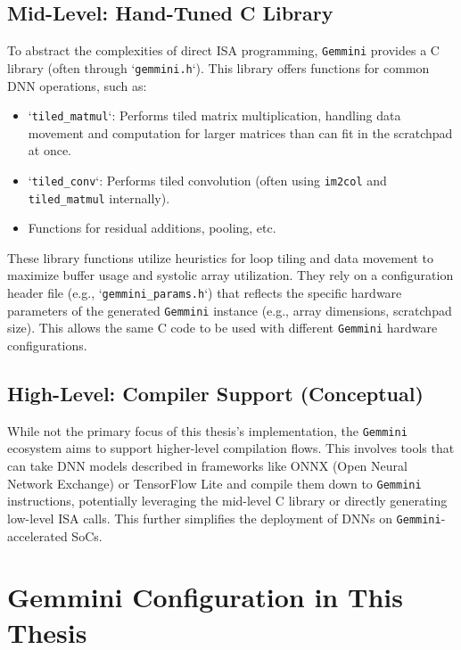\subsection{Mid-Level: Hand-Tuned C Library}
\label{subsec:gemmini_mid_level_library}
To abstract the complexities of direct ISA programming, \texttt{Gemmini} provides a C library (often through `\texttt{gemmini.h}`). This library offers functions for common DNN operations, such as:
\begin{itemize}
    \item `\texttt{tiled\_matmul}`: Performs tiled matrix multiplication, handling data movement and computation for larger matrices than can fit in the scratchpad at once.
    \item `\texttt{tiled\_conv}`: Performs tiled convolution (often using \texttt{im2col} and \texttt{tiled\_matmul} internally).
    \item Functions for residual additions, pooling, etc.
\end{itemize}
These library functions utilize heuristics for loop tiling and data movement to maximize buffer usage and systolic array utilization. They rely on a configuration header file (e.g., `\texttt{gemmini\_params.h}`) that reflects the specific hardware parameters of the generated \texttt{Gemmini} instance (e.g., array dimensions, scratchpad size). This allows the same C code to be used with different \texttt{Gemmini} hardware configurations.

\subsection{High-Level: Compiler Support (Conceptual)}
\label{subsec:gemmini_high_level_compiler}
While not the primary focus of this thesis's implementation, the \texttt{Gemmini} ecosystem aims to support higher-level compilation flows. This involves tools that can take DNN models described in frameworks like ONNX (Open Neural Network Exchange) or TensorFlow Lite and compile them down to \texttt{Gemmini} instructions, potentially leveraging the mid-level C library or directly generating low-level ISA calls. This further simplifies the deployment of DNNs on \texttt{Gemmini}-accelerated SoCs.

\section{Gemmini Configuration in This Thesis}
\label{sec:gemmini_configuration_thesis}

